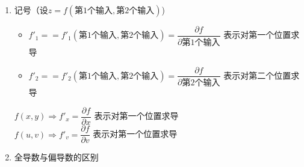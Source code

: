 \documentclass[../book.tex]{subfiles}
\begin{document}
\begin{enumerate}
        \begin{analysisbox}[Example]
            设 $z = f(u,v)$，其中 $u = \varphi(x,y)$，$v = \psi(x,y)$，求 $\dfrac{\partial^2 z}{\partial x^2}$。

            \textbf{一阶偏导}：
            \[
                \frac{\partial z}{\partial x} = f'_u \cdot \varphi'_x + f'_v \cdot \psi'_x
            \]

            注意：$f'_u$ 和 $f'_v$ \textbf{仍是 $u, v$ 的函数}，复合结构未变。

            \textbf{二阶偏导}：对 $f'_u \cdot \varphi'_x + f'_v \cdot \psi'_x$ 再求 $\dfrac{\partial}{\partial x}$ 时，\textbf{仍需用链式法则}：
            \begin{align*}
                \frac{\partial^2 z}{\partial x^2} &= \frac{\partial}{\partial x}(f'_u \cdot \varphi'_x) + \frac{\partial}{\partial x}(f'_v \cdot \psi'_x) \\
                &= \left(f''_{uu} \cdot \varphi'_x + f''_{uv} \cdot \psi'_x\right)\varphi'_x + f'_u \cdot \varphi''_{xx} \\
                &\quad + \left(f''_{vu} \cdot \varphi'_x + f''_{vv} \cdot \psi'_x\right)\psi'_x + f'_v \cdot \psi''_{xx}
            \end{align*}

            \textbf{关键}：求 $\dfrac{\partial}{\partial x}(f'_u)$ 时，$f'_u$ 仍要通过 $u, v$ 对 $x$ 求导。
        \end{analysisbox}
        \item 记号（设$z = f(\boxed{\text{第1个输入}},\boxed{\text{第2个输入}})$)
        \begin{itemize}
            \item $f'_1 == f'_1(\boxed{\text{第1个输入}},\boxed{\text{第2个输入}}) = \dfrac{\partial f}{\partial \boxed{\text{第1个输入}}}$ 表示对第一个位置求导
            \item $f'_2 == f'_2(\boxed{\text{第1个输入}},\boxed{\text{第2个输入}}) = \dfrac{\partial f}{\partial \boxed{\text{第2个输入}}}$ 表示对第二个位置求导
        \end{itemize}
        \begin{analysisbox}[Example]
            $f(x, y) \Rightarrow f'_x = \dfrac{\partial f}{\partial x}$ 表示对第一个位置求导 \\
            $f(u, v) \Rightarrow f'_v = \dfrac{\partial f}{\partial v}$ 表示对第一个位置求导
        \end{analysisbox}

        \item 全导数与偏导数的区别
    \end{enumerate}
\end{document}
